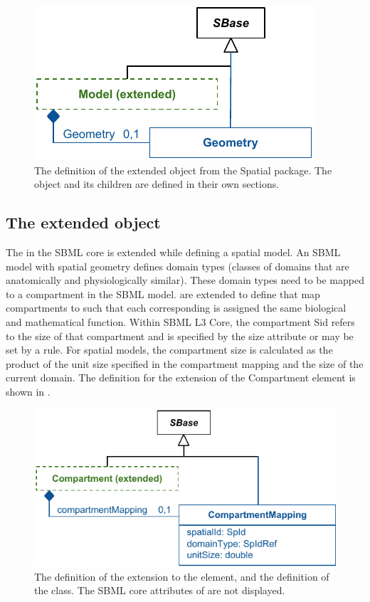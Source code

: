 \begin{figure}[ht]
  \includegraphics{figs/extended-model-uml}
  \caption{The definition of the extended \Model object from the Spatial package.  The \Geometry object and its children are defined in their own sections.}
  \label{model-uml}
\end{figure}




\subsection{The extended \Compartment object}
\label{extended-compartment-class}

The \Compartment in the SBML core is extended while defining a spatial model. An SBML model with spatial geometry defines domain types (classes of domains that are anatomically and physiologically similar). These domain types need to be mapped to a compartment in the SBML model. \Compartments are extended to define \CompartmentMappings that map compartments to \DomainTypes such that each corresponding \DomainType is assigned the same biological and mathematical function. Within SBML L3 Core, the compartment Sid refers to the size of that compartment and is specified by the size attribute or may be set by a rule.  For spatial models, the compartment size is calculated as the product of the unit size specified in the compartment mapping and the size of the current domain. The definition for the extension of the Compartment element is shown in .
 
\begin{figure}[ht]
  \includegraphics{figs/extended-compartment-uml}
  \caption{The definition of the extension to the \Compartment element, and the definition of the \CompartmentMapping class. The SBML core attributes of \Compartment are not displayed.}
  \label{compartment-uml}
  \label{CompartmentMapping-uml}
\end{figure}



